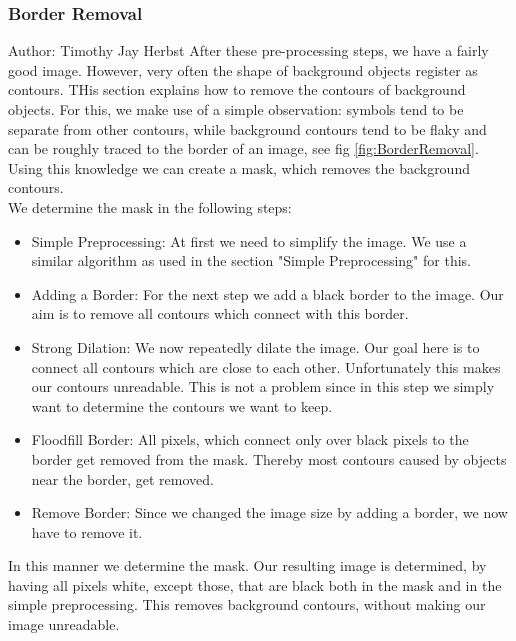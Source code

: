\documentclass[12pt]{article}
\begin{document}
	\subsubsection{Border Removal}%
		\small{Author: Timothy Jay Herbst} \newline \newline
		After these pre-processing steps, we have a fairly good image.
		However, very often the shape of background objects register as contours.
		THis section explains how to remove the contours of background objects.
		For this, we make use of a simple observation: symbols tend to be separate from other contours, while background contours tend to be flaky and can be roughly traced to the border of an image, see fig \ref{fig:BorderRemoval}.
		Using this knowledge we can create a mask, which removes the background contours.\\
		We determine the mask in the following steps:
		\begin{itemize}
			\item Simple Preprocessing: At first we need to simplify the image. We use a similar algorithm as used in the section "Simple Preprocessing" for this.
			\item Adding a Border: For the next step we add a black border to the image. Our aim is to remove all contours which connect with this border.
			\item Strong Dilation: We now repeatedly dilate the image. Our goal here is to connect all contours which are close to each other.
			Unfortunately this makes our contours unreadable.
			This is not a problem since in this step we simply want to determine the contours we want to keep.
			\item Floodfill Border: All pixels, which connect only over black pixels to the border get removed from the mask.
			Thereby most contours caused by objects near the border, get removed.
			\item Remove Border: Since we changed the image size by adding a border, we now have to remove it.
		\end{itemize}
		In this manner we determine the mask.
		Our resulting image is determined, by having all pixels white, except those, that are black both in the mask and in the simple preprocessing.
		This removes background contours, without making our image unreadable.
\end{document}
